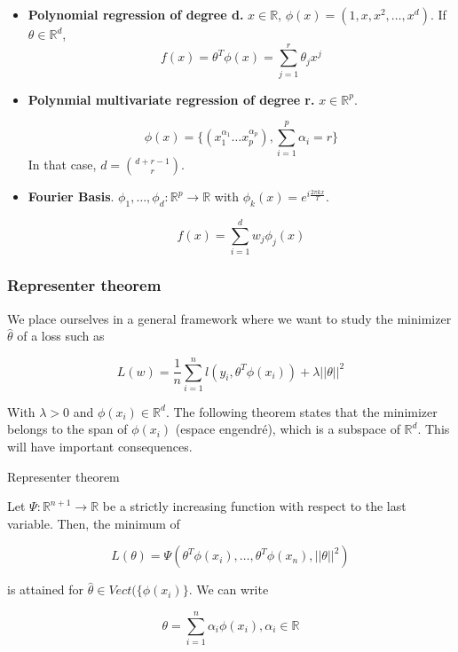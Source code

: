 \documentclass[
10pt, %
a4paper, %
oneside, %
headinclude,footinclude, %
BCOR5mm, %
]{scrartcl}
\begin{document}
\begin{itemize}
    \item \textbf{{Polynomial regression of degree d.}} $x\in \mathbb{R}$, $\phi(x) = (1, x, x^2, \dots, x^d)$. If $\theta\in \mathbb{R}^d$, 
	\begin{equation*}
	    f(x) = \theta^T\phi(x) = \sum^{r}_{j=1} \theta_jx^j
	\end{equation*}
    \item \textbf{{Polynmial multivariate regression of degree r.}} $x\in \mathbb{R}^p$.

	\begin{equation*}
	    \phi(x) = \{(x_1^{\alpha_1}\dots x_p^{\alpha_p}),{ \sum^{p}_{i=1} \alpha_i = r}\}
	\end{equation*}
	In that case, $d = \binom{d+r-1}{r}$.
    \item \textbf{{Fourier Basis}}. $\phi_1, \dots, \phi_d: \mathbb{R}^p\rightarrow \mathbb{R} $ with $\phi_k(x) = e^{i \frac{2\pi kx}{T}} $.

	\begin{equation*}
	    f(x) = \sum^{d}_{i=1} w_j\phi_j(x)
	\end{equation*}
\end{itemize}

\subsubsection{\large\color{Periwinkle}Representer theorem}

We place ourselves in a general framework where we want to study the minimizer $ \hat{\theta}$ of a loss such as

\begin{equation}
    \label{eq:genloss}
    L(w) = \frac{1}{n} \sum^{n}_{i=1} l(y_i, \theta^T\phi(x_i))+\lambda ||\theta||^2
\end{equation}

With $\lambda>0$ and $\phi(x_i)\in \mathbb{R}^d$. The following theorem states that the minimizer belongs to the span of $\phi(x_i)$ (espace engendré), which is a subspace of $ \mathbb{R}^d$. This will have important consequences.

\begin{theorem}{Representer theorem}

    Let $\Psi : \mathbb{R}^{n+1}\rightarrow \mathbb{R} $ be a strictly increasing function with respect to the last variable. Then, the minimum of 

    \begin{equation*}
	L(\theta)  =\Psi(\theta^T\phi(x_i), \dots, \theta^T\phi(x_n), ||\theta||^2)
    \end{equation*}

    is attained for $ \hat{\theta}\in Vect(\{\phi(x_i)\}$. We can write
    
    \begin{equation*}
	\theta = \sum^{n}_{i=1} \alpha_i\phi(x_i), \alpha_i\in \mathbb{R}
    \end{equation*}
\end{theorem}
\end{document}
